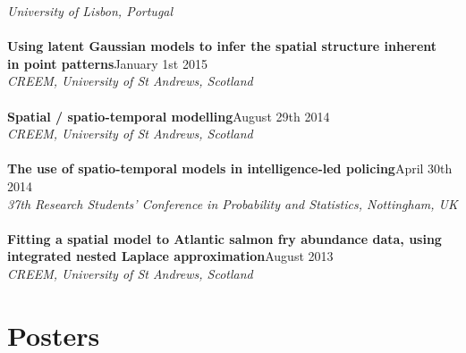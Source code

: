 \documentclass[10pt,letter]{article}
\begin{document}
 {\sl University of Lisbon, Portugal}\\
 \hdashrule[0.5ex]{4cm}{1pt}{1pt}\\
 {\textbf{Using latent Gaussian models to infer the spatial
structure inherent \\in point patterns}}\hfill January 1st 2015\\
 {\sl CREEM, University of St Andrews, Scotland}\\
 \hdashrule[0.5ex]{4cm}{1pt}{1pt}\\
 {\textbf{Spatial / spatio-temporal modelling}}\hfill August 29th 2014\\
 {\sl CREEM, University of St Andrews, Scotland}\\
 \hdashrule[0.5ex]{4cm}{1pt}{1pt}\\
{\textbf{The use of spatio-temporal models in intelligence-led policing}}\hfill  April 30th 2014\\
 {\sl 37th Research Students' Conference in Probability and Statistics, Nottingham, UK}\\
 \hdashrule[0.5ex]{4cm}{1pt}{1pt}\\
{\textbf{Fitting a spatial model to Atlantic salmon fry abundance data, using\\ integrated nested Laplace approximation}}\hfill  August 2013\\
 {\sl CREEM, University of St Andrews, Scotland}\\ 
 \vspace{-1mm}
\newpage
\section*{Posters}
\vspace{1mm}
\end{document}
